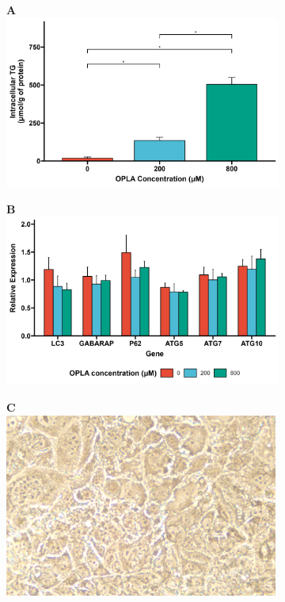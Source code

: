 \begin{figure}[h!]
\centering
     \begin{subfigure}[b]{0.49\textwidth}
    \textbf{A}
     \centering
         \includegraphics[width=\textwidth]{figures/ch3-Model Development/LFHF TG.png}
     \end{subfigure}  
     \hfill
     \begin{subfigure}[b]{0.49\textwidth}
         \textbf{B}
         \centering
         \includegraphics[width=\textwidth]{figures/ch3-Model Development/LFHF ATG genes.png}
     \end{subfigure}
     \hfill
      \begin{subfigure}[b]{0.49\textwidth}
         \textbf{C}
         \centering
         \includegraphics[width=\textwidth]{figures/ch3-Model Development/OPLA 0uM Picture.png}

\end{subfigure}
\end{figure}
